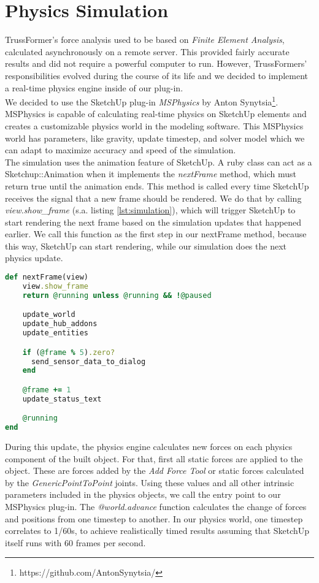 \section{Physics Simulation}\label{sec:simulation}
TrussFormer's force analysis used to be based on \textit{Finite Element Analysis}, calculated asynchronously on a remote server. This provided fairly accurate results and did not require a powerful computer to run. However, TrussFormers' responsibilities evolved during the course of its life and we decided to implement a real-time physics engine inside of our plug-in.\\
We decided to use the SketchUp plug-in \textit{MSPhysics} by Anton Synytsia\footnote{https://github.com/AntonSynytsia/}. MSPhysics is capable of calculating real-time physics on SketchUp elements and creates a customizable physics world in the modeling software. This MSPhysics world has parameters, like gravity, update timestep, and solver model which we can adapt to maximize accuracy and speed of the simulation.\\
The simulation uses the animation feature of SketchUp. A ruby class can act as a Sketchup::Animation when it implements the \textit{nextFrame} method, which must return true until the animation ends. This method is called every time SketchUp receives the signal that a new frame should be rendered. We do that by calling \textit{view.show\_frame} (s.a. listing \ref{lst:simulation}), which will trigger SketchUp to start rendering the next frame based on the simulation updates that happened earlier. We call this function as the first step in our nextFrame method, because this way, SketchUp can start rendering, while our simulation does the next physics update.\\
\begin{lstlisting}[language=Ruby, label={lst:simulation}, caption=Simulation nextFrame method]
def nextFrame(view)
    view.show_frame
    return @running unless @running && !@paused

    update_world
    update_hub_addons
    update_entities

    if (@frame % 5).zero?
      send_sensor_data_to_dialog
    end

    @frame += 1
    update_status_text

    @running
end
\end{lstlisting}
During this update, the physics engine calculates new forces on each physics component of the built object. For that, first all static forces are applied to the object. These are forces added by the \textit{Add Force Tool} or static forces calculated by the \textit{GenericPointToPoint} joints. Using these values and all other intrinsic parameters included in the physics objects, we call the entry point to our MSPhysics plug-in. The \textit{@world.advance} function calculates the change of forces and positions from one timestep to another. In our physics world, one timestep correlates to 1/60s, to achieve realistically timed results assuming that SketchUp itself runs with 60 frames per second.\\
